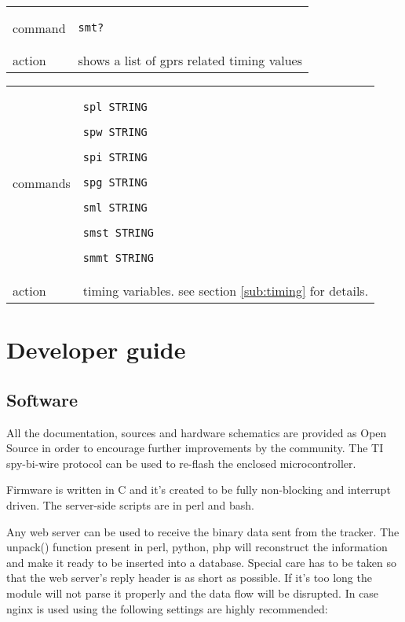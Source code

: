 \documentclass[a4paper,twoside]{refart}
\begin{document}
\begin{tabular}{ |l|p{8cm}| }
    \hline
        command & 
\begin{lstlisting}
smt?
\end{lstlisting} \\
        action & 
shows a list of gprs related timing values\\ \hline
\end{tabular}

\begin{tabular}{ |l|p{8cm}| }
    \hline
        commands & 
\begin{lstlisting}
spl STRING
\end{lstlisting}
\begin{lstlisting}
spw STRING
\end{lstlisting}
\begin{lstlisting}
spi STRING
\end{lstlisting}
\begin{lstlisting}
spg STRING
\end{lstlisting}
\begin{lstlisting}
sml STRING
\end{lstlisting}
\begin{lstlisting}
smst STRING
\end{lstlisting}
\begin{lstlisting}
smmt STRING
\end{lstlisting} \\
        action &
timing variables. see section \ref{sub:timing} for details.
\\ \hline
\end{tabular}


\section{Developer guide}
\subsection{Software}

All the documentation, sources and hardware schematics are provided as Open Source in order to encourage further improvements by the community. The TI spy-bi-wire protocol can be used to re-flash the enclosed microcontroller.

Firmware is written in C and it's created to be fully non-blocking and interrupt driven. The server-side scripts are in perl and bash.

Any web server can be used to receive the binary data sent from the tracker. The unpack() function present in perl, python, php will reconstruct the information and make it ready to be inserted into a database. Special care has to be taken so that the web server's reply header is as short as possible. If it's too long the module will not parse it properly and the data flow will be disrupted. In case nginx is used using the following settings are highly recommended:
\end{document}
